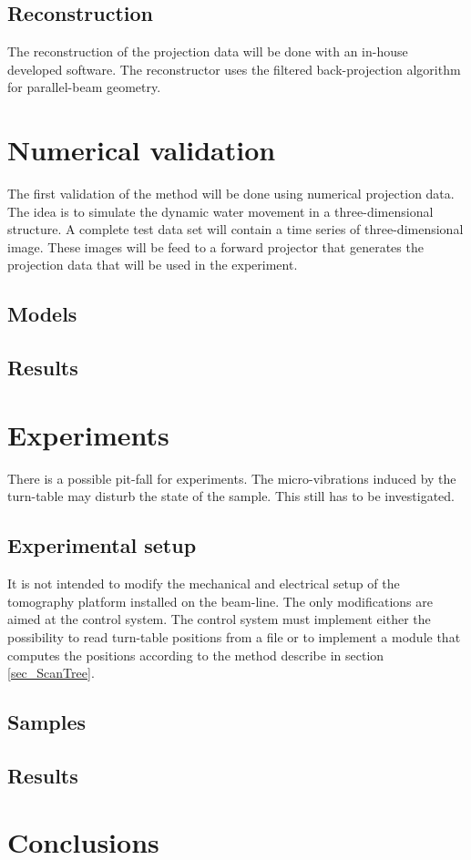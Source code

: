 \documentclass[a4paper,10pt]{scrartcl}
\begin{document}
\subsection{Reconstruction}
The reconstruction of the projection data will be done with an in-house developed software. The reconstructor uses the filtered back-projection algorithm for parallel-beam geometry.

\section{Numerical validation}
The first validation of the method will be done using numerical projection data. The idea is to simulate the dynamic water movement in a three-dimensional structure. A complete test data set will contain a time series of three-dimensional image. These images will be feed to a forward projector that generates the projection data that will be used in the experiment.
\subsection{Models}

\subsection{Results}
\section{Experiments}
There is a possible pit-fall for experiments. The micro-vibrations induced by the turn-table may disturb the state of the sample. This still has to be investigated.
\subsection{Experimental setup}
It is not intended to modify the mechanical and electrical setup of the tomography platform installed on the beam-line. The only modifications are aimed at the control system. The control system must implement either the possibility to read turn-table positions from a file or to implement a module that computes the positions according to the method describe in section \ref{sec_ScanTree}.

\subsection{Samples}
\subsection{Results}
\section{Conclusions}



\end{document}
